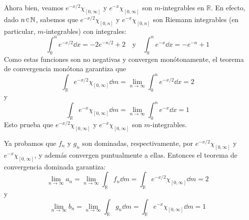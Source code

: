 \begin{sol}
Ahora bien, veamos $e^{-x/2}\chi_{[0,\infty]}$ y $e^{-x}\chi_{[0,\infty]}$ son $m$-integrables en $\mathbb{R}$. En efecto, dado $n\en\mathbb{N}$, sabemos que $e^{-x/2}\chi_{[0,n]}$ y $e^{-x}\chi_{[0,n]}$ son Riemann integrables (en particular, $m$-integrables) con integrales:
\[
\int^n_0e^{-x/2} \dd{x} = -2e^{-n/2} + 2 
\quad\text{y}\quad
\int^n_0 e^{-x} \dd{x} = -e^{-n} +1
\]
Como estas funciones son no negativas y convergen monótonamente, el teorema de convergencia monótona garantiza que 
\[
\int_{\mathbb{R}}e^{-x/2}\chi_{[0,\infty]} \dd{m} = \lim_{n\to\infty}\int^n_0e^{-x/2} \dd{x} = 2
\]
y
\[
\int_{\mathbb{R}}e^{-x}\chi_{[0,\infty]} \dd{m} = \lim_{n\to\infty}\int^n_0 e^{-x} \dd{x} = 1
\]
Esto prueba que $e^{-x/2}\chi_{[0,\infty]}$ y $e^{-x}\chi_{[0,\infty]}$ son $m$-integrables.\par
Ya probamos que $f_n$ y $g_n$ son dominadas, respectivamente, por $e^{-x/2}\chi_{[0,\infty]}$ y $e^{-x}\chi_{[0,\infty]}$, y además convergen puntualmente a ellas. Entonces el teorema de convergencia dominada garantiza:
\[
\lim_{n\to\infty}a_n = \lim_{n\to\infty}\int_{\mathbb{R}} f_n \dd{m} = \int_{\mathbb{R}} e^{-x/2}\chi_{[0,\infty]} \dd{m} = 2
\]
y
\[
\lim_{n\to\infty}b_n = \lim_{n\to\infty}\int_{\mathbb{R}} g_n \dd{m} = \int_{\mathbb{R}} e^{-x}\chi_{[0,\infty]} \dd{m} = 1
\]
\end{sol}